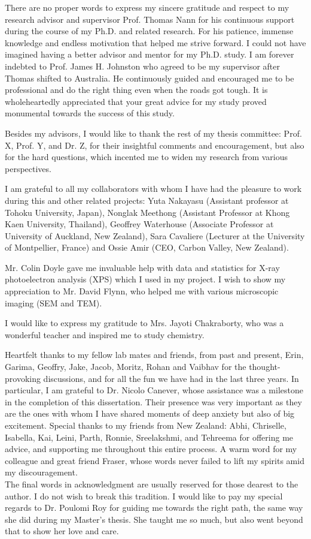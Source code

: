 \documentclass[
11pt, %
oneside, %
english, %
onehalfspacing, %
nolistspacing, %
liststotoc, %
headsepline, %
consistentlayout, %
]{name} %
\begin{document}
\begin{acknowledgements}
\addchaptertocentry{\acknowledgementname} 
There are no proper words to express my sincere gratitude and respect to my research advisor and supervisor Prof. Thomas Nann for his continuous support during the course of my Ph.D. and related research. For his patience, immense knowledge and endless motivation that helped me strive forward. I could not have imagined having a better advisor and mentor for my Ph.D. study.
I am forever indebted to Prof. James H. Johnston who agreed to be my supervisor after Thomas shifted to Australia. He continuously guided and encouraged me to be professional and do the right thing even when the roads got tough. It is wholeheartedly appreciated that your great advice for my study proved monumental towards the success of this study. 

Besides my advisors, I would like to thank the rest of my thesis committee: Prof. X, Prof. Y, and Dr. Z, for their insightful comments and encouragement, but also for the hard questions, which incented me to widen my research from various perspectives.

I am grateful to all my collaborators with whom I have had the pleasure to work during this and other related projects: Yuta Nakayasu (Assistant professor at Tohoku University, Japan), Nonglak Meethong (Assistant Professor at Khong Kaen University, Thailand), Geoffrey Waterhouse (Associate Professor at University of Auckland, New Zealand), Sara Cavaliere (Lecturer at the University of Montpellier, France) and Ossie Amir (CEO, Carbon Valley, New Zealand).

Mr. Colin Doyle gave me invaluable help with data and statistics for X-ray photoelectron analysis (XPS) which I used in my project. I wish to show my appreciation to Mr. David Flynn, who helped me with various microscopic imaging (SEM and TEM).

I would like to express my gratitude to Mrs. Jayoti Chakraborty, who was a wonderful teacher and inspired me to study chemistry.

Heartfelt thanks to my fellow lab mates and friends, from past and present, Erin, Garima, Geoffry, Jake, Jacob, Moritz, Rohan and Vaibhav for the thought-provoking discussions, and for all the fun we have had in the last three years. In particular, I am grateful to Dr. Nicolo Canever, whose assistance was a milestone in the completion of this dissertation. Their presence was very important as they are the ones with whom I have shared moments of deep anxiety but also of big excitement. Special thanks to my friends from New Zealand: Abhi, Chriselle, Isabella, Kai, Leini, Parth, Ronnie, Sreelakshmi, and Tehreema for offering me advice, and supporting me throughout this entire process. A warm word for my colleague and great friend Fraser, whose words never failed to lift my spirits amid my discouragement.\\
The final words in acknowledgment are usually reserved for those dearest to the author. I do not wish to break this tradition. I would like to pay my special regards to Dr. Poulomi Roy for guiding me towards the right path, the same way she did during my Master's thesis. She taught me so much, but also went beyond that to show her love and care. 


\end{acknowledgements}
\end{document}

